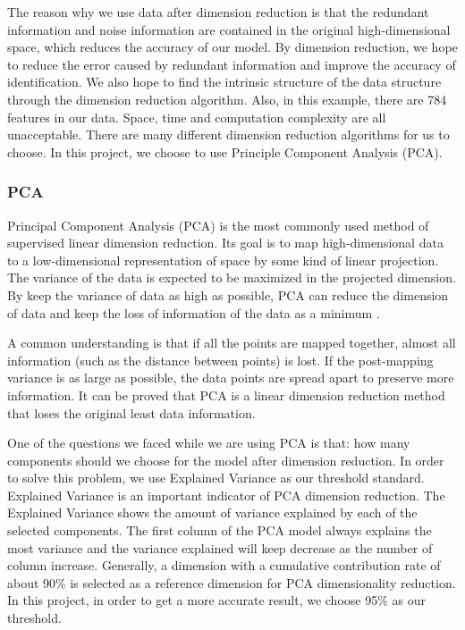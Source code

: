 \documentclass[sigconf]{acmart}
\begin{document}
The reason why we use data after dimension reduction is that the redundant information and noise information are contained in the original high-dimensional space, which reduces the accuracy of our model. By dimension reduction, we hope to reduce the error caused by redundant information and improve the accuracy of identification. We also hope to find the intrinsic structure of the data structure through the dimension reduction algorithm. Also, in this example, there are 784 features in our data. Space, time and computation complexity are all unacceptable. There are many different dimension reduction algorithms for us to choose. In this project, we choose to use Principle Component Analysis (PCA).

\subsubsection{PCA}

Principal Component Analysis (PCA) is the most commonly used method of supervised linear dimension reduction. Its goal is to map high-dimensional data to a low-dimensional representation of space by some kind of linear projection. The variance of the data is expected to be maximized in the projected dimension. By keep the variance of data as high as possible, PCA can reduce the dimension of data and keep the loss of information of the data as a minimum \cite{PCA}.

A common understanding is that if all the points are mapped together, almost all information (such as the distance between points) is lost. If the post-mapping variance is as large as possible, the data points are spread apart to preserve more information. It can be proved that PCA is a linear dimension reduction method that loses the original least data information.

One of the questions we faced while we are using PCA is that: how many components should we choose for the model after dimension reduction. In order to solve this problem, we use Explained Variance as our threshold standard. Explained Variance is an important indicator of PCA dimension reduction. The Explained Variance shows the amount of variance explained by each of the selected components. The first column of the PCA model always explains the most variance and the variance explained will keep decrease as the number of column increase. Generally, a dimension with a cumulative contribution rate of about 90\% is selected as a reference dimension for PCA dimensionality reduction. In this project, in order to get a more accurate result, we choose 95\% as our threshold.
\end{document}
